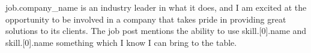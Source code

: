 {{job.company_name}} is an industry leader in what it does, and I am excited at the opportunity to be involved in a company that takes pride in providing great solutions to its clients. The job post mentions the ability to use {{skill.[0].name}} and {{skill.[0].name}} something which I know I can bring to the table.
